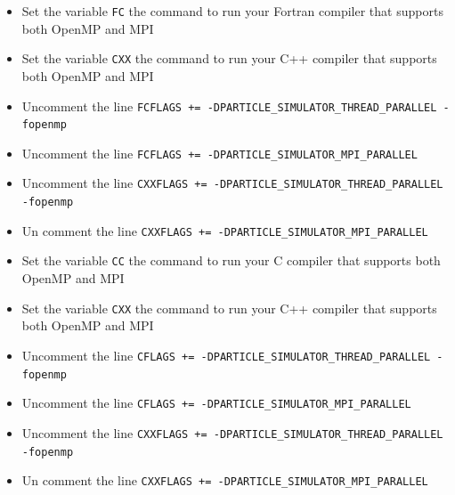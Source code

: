 \begin{itemize}
\begin{itemize}
\ifFtn %
\item Set the variable \texttt{FC} the command to run your Fortran compiler that supports both OpenMP and MPI
\item Set the variable \texttt{CXX} the command to run your C++ compiler that supports both OpenMP and MPI
\item Uncomment the line \texttt{FCFLAGS += -DPARTICLE\_SIMULATOR\_THREAD\_PARALLEL -fopenmp}
\item Uncomment the line \texttt{FCFLAGS += -DPARTICLE\_SIMULATOR\_MPI\_PARALLEL}
\item Uncomment the line \texttt{CXXFLAGS += -DPARTICLE\_SIMULATOR\_THREAD\_PARALLEL -fopenmp}
\item Un comment the line \texttt{CXXFLAGS += -DPARTICLE\_SIMULATOR\_MPI\_PARALLEL}
\endifFtn
\ifC %
\item Set the variable \texttt{CC} the command to run your C compiler that supports both OpenMP and MPI
\item Set the variable \texttt{CXX} the command to run your C++ compiler that supports both OpenMP and MPI
\item Uncomment the line \texttt{CFLAGS += -DPARTICLE\_SIMULATOR\_THREAD\_PARALLEL -fopenmp}
\item Uncomment the line \texttt{CFLAGS += -DPARTICLE\_SIMULATOR\_MPI\_PARALLEL}
\item Uncomment the line \texttt{CXXFLAGS += -DPARTICLE\_SIMULATOR\_THREAD\_PARALLEL -fopenmp}
\item Un comment the line \texttt{CXXFLAGS += -DPARTICLE\_SIMULATOR\_MPI\_PARALLEL}
\endifC
\end{itemize}
\end{itemize}

